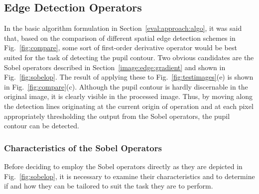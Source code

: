 \subsection{Edge Detection Operators}
\label{algo:pos:operators}


In the basic algorithm formulation in
Section~\ref{eval:approach:algo}, it was said that, based on the
comparison of different spatial edge detection schemes in
Fig.~\ref{fig:compare}, some sort of first-order derivative operator
would be best suited for the task of detecting the pupil contour.  Two
obvious candidates are the Sobel operators described in
Section~\ref{image:edge:gradient} and shown in Fig.~\ref{fig:sobelop}.
The result of applying these to Fig.~\ref{fig:testimages}(e) is shown
in Fig.~\ref{fig:compare}(c).  Although the pupil contour is hardly
discernable in the original image, it is clearly visible in the
processed image.  Thus, by moving along the detection lines
originating at the current origin of operation and at each pixel
appropriately thresholding the output from the Sobel operators, the
pupil contour can be detected.

\subsubsection{Characteristics of the Sobel Operators}

Before deciding to employ the Sobel operators directly as they are
depicted in Fig.~\ref{fig:sobelop}, it is necessary to examine their
characteristics and to determine if and how they can be tailored to
suit the task they are to perform.

